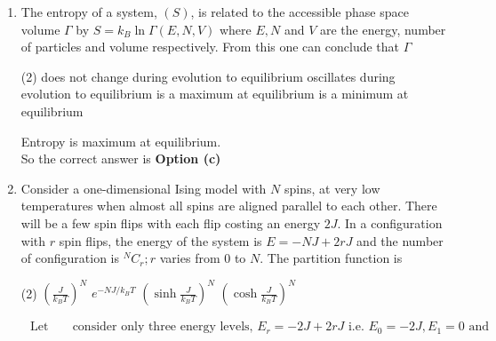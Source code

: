 \begin{enumerate}
\begin{answer}
\begin{align*}
\text{ and }n_{2}=0,1,2,3 \ldots .\\
\intertext{	Ground state energy $E=\frac{3 \hbar \omega_{1}}{2}$, first excited state energy $E=\frac{5 \hbar \omega_{1}}{2}$. Second excited state energy $E=\frac{7 \hbar \omega_{1}}{2}$ which is doubly degenerate state so $g=2$, other state have more energy than $4 \hbar \omega_{1}$.}
	P\left(E<4 \hbar \omega_{1}\right)&=\frac{e^{-\frac{3 \beta \hbar \omega_{1}}{2}}+e^{-\frac{5 \beta \hbar \omega_{1}}{2}}+2 e^{-\frac{7 \beta \hbar \omega_{1}}{2}}}{Z}=\frac{x^{3 / 2}\left(1+x+2 x^{2}\right)}{Z}\text{ where }x=e^{-\beta \hbar \omega_{1}} .
	\end{align*}
	So the correct answer is \textbf{Option (d)}
\end{answer}
\item 	The entropy of a system, $(S)$, is related to the accessible phase space volume $\Gamma$ by $S=k_{B} \ln \Gamma(E, N, V)$ where $E, N$ and $V$ are the energy, number of particles and volume respectively. From this one can conclude that $\Gamma$
{	}
	 \begin{tasks}(2)
		\task[\textbf{a.}]does not change during evolution to equilibrium
		\task[\textbf{b.}]oscillates during evolution to equilibrium
		\task[\textbf{c.}]is a maximum at equilibrium
		\task[\textbf{d.}]is a minimum at equilibrium 
	\end{tasks}
\begin{answer}
	Entropy is maximum at equilibrium.\\
		So the correct answer is \textbf{Option (c)}
\end{answer}
\item 	Consider a one-dimensional Ising model with $N$ spins, at very low temperatures when almost all spins are aligned parallel to each other. There will be a few spin flips with each flip costing an energy $2 J$. In a configuration with $r$ spin flips, the energy of the system is $E=-N J+2 r J$ and the number of configuration is ${ }^{N} C_{r} ; r$ varies from 0 to $N$. The partition function is
{	}
	 \begin{tasks}(2)
		\task[\textbf{a.}] $\left(\frac{J}{k_{B} T}\right)^{N}$
		\task[\textbf{b.}]$e^{-N J / k_{B} T}$
		\task[\textbf{c.}] $\left(\sinh \frac{J}{k_{B} T}\right)^{N}$
		\task[\textbf{d.}] $\left(\cosh \frac{J}{k_{B} T}\right)^{N}$
	\end{tasks}
\begin{answer}
	\begin{align*}
	\text { Let us}&\text{ consider only three energy levels, } E_{r}=-2 J+2 r J \text { i.e. } E_{0}=-2 J, E_{1}=0 \text { and }\\

\end{align*}
\end{answer}
\end{enumerate}
